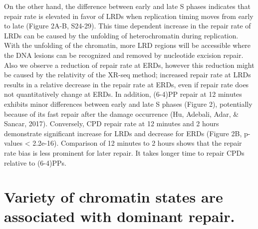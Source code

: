 On the other hand, the difference between early and late S phases indicates that repair rate is elevated in favor of LRDs when replication timing moves from early to late (Figure 2A-B, S24-29). This time dependent increase in the repair rate of LRDs can be caused by the unfolding of heterochromatin during replication. With the unfolding of the chromatin, more LRD regions will be accessible where the DNA lesions can be recognized and removed by nucleotide excision repair. Also we observe a reduction of repair rate at ERDs, however this reduction might be caused by the relativity of the XR-seq method; increased repair rate at LRDs results in a relative decrease in the repair rate at ERDs, even if repair rate does not quantitatively change at ERDs. In addition, (6-4)PP repair at 12 minutes exhibits minor differences between early and late S phases (Figure 2), potentially because of its fast repair after the damage occurrence (Hu, Adebali, Adar, \& Sancar, 2017). Conversely, CPD repair rate at 12 minutes and 2 hours demonstrate significant increase for LRDs and decrease for ERDs (Figure 2B, p-values < 2.2e-16). Comparison of 12 minutes to 2 hours shows that the repair rate bias is less prominent for later repair. It takes longer time to repair CPDs relative to (6-4)PPs.

\section{Variety of chromatin states are associated with dominant repair.}

